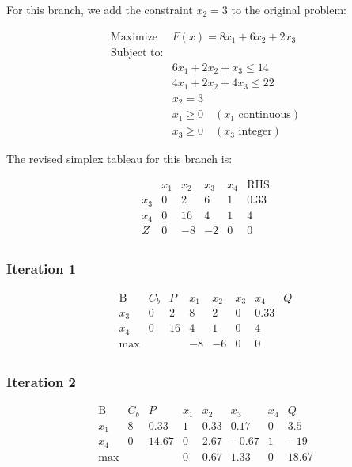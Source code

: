 \documentclass[12pt]{article}
\begin{document}
For this branch, we add the constraint \( x_2 = 3 \) to the original problem:

\[
\begin{aligned}
\text{Maximize } & F(x) = 8x_1 + 6x_2 + 2x_3 \\
\text{Subject to:} \\
& 6x_1 + 2x_2 + x_3 \leq 14 \\
& 4x_1 + 2x_2 + 4x_3 \leq 22 \\
& x_2 = 3 \\
& x_1 \geq 0 \quad (x_1 \text{ continuous}) \\
& x_3 \geq 0 \quad (x_3 \text{ integer})
\end{aligned}
\]

The revised simplex tableau for this branch is:

\[
\begin{array}{c|ccccc|c}
 & x_1 & x_2 & x_3 & x_4 & \text{RHS} \\
\hline
x_3 & 0 & 2 & 6 & 1 & 0.33 \\
x_4 & 0 & 16 & 4 & 1 & 4 \\
\hline
Z & 0 & -8 & -2 & 0 & 0 \\
\end{array}
\]

\subsubsection*{Iteration 1}

\[
\begin{array}{c|ccccc|c}
\text{B} & C_b & P & x_1 & x_2 & x_3 & x_4 & Q \\
\hline
x_3 & 0 & 2 & 8 & 2 & 0 & 0.33 \\
x_4 & 0 & 16 & 4 & 1 & 0 & 4 \\
\hline
\text{max} & & & -8 & -6 & 0 & 0 \\
\end{array}
\]

\subsubsection*{Iteration 2}

\[
\begin{array}{c|ccccc|c}
\text{B} & C_b & P & x_1 & x_2 & x_3 & x_4 & Q \\
\hline
x_1 & 8 & 0.33 & 1 & 0.33 & 0.17 & 0 & 3.5 \\
x_4 & 0 & 14.67 & 0 & 2.67 & -0.67 & 1 & -19 \\
\hline
\text{max} & & & 0 & 0.67 & 1.33 & 0 & 18.67 \\
\end{array}
\]
\end{document}
